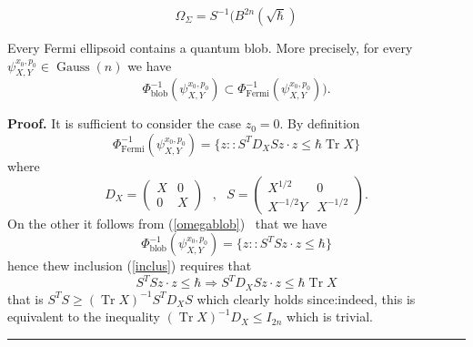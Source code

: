 \documentclass[10pt,a4paper]{amsart}
\newenvironment{proof}[1][Proof]{\noindent\textbf{#1.} }{\ \rule{0.5em}{0.5em}}
\begin{document}
\begin{equation}
\Omega_{\Sigma}=S^{-1}(B^{2n}(\sqrt{\hbar}) \label{omegablob}%
\end{equation}

\begin{proposition}
\label{propinclus}Every Fermi ellipsoid contains a quantum blob. More
precisely, for every $\psi_{X,Y}^{x_{0},p_{0}}\in\operatorname*{Gauss}(n)$ we
have
\begin{equation}
\Phi_{\mathrm{blob}}^{-1}(\psi_{X,Y}^{x_{0},p_{0}})\subset\Phi
_{\mathrm{\operatorname{Fermi}}}^{-1}(\psi_{X,Y}^{x_{0},p_{0}})).
\label{inclus}%
\end{equation}

\end{proposition}

\begin{proof}
It is sufficient to consider the case $z_{0}=0.$ By definition%
\[
\Phi_{\mathrm{\operatorname{Fermi}}}^{-1}(\psi_{X,Y}^{x_{0},p_{0}}%
)=\{z::S^{T}D_{X}Sz\cdot z\leq\hbar\operatorname*{Tr}X\}
\]
where
\begin{equation}
D_{X}=%
\begin{pmatrix}
X & 0\\
0 & X
\end{pmatrix}
\text{ \ },\text{ \ }S=%
\begin{pmatrix}
X^{1/2} & 0\\
X^{-1/2}Y & X^{-1/2}%
\end{pmatrix}
.
\end{equation}
On the other it follows from (\ref{omegablob}) \ that we have%
\[
\Phi_{\mathrm{blob}}^{-1}(\psi_{X,Y}^{x_{0},p_{0}})=\{z::S^{T}Sz\cdot
z\leq\hbar\}
\]
hence thew inclusion (\ref{inclus}) requires that
\[
S^{T}Sz\cdot z\leq\hbar\Longrightarrow S^{T}D_{X}Sz\cdot z\leq\hbar
\operatorname*{Tr}X
\]
that is $S^{T}S\geq(\operatorname*{Tr}X)^{-1}S^{T}D_{X}S$ which clearly holds
since:indeed, this is equivalent to the inequality $(\operatorname*{Tr}%
X)^{-1}D_{X}\leq I_{2n}$ which is trivial.
\end{proof}
\end{document}

